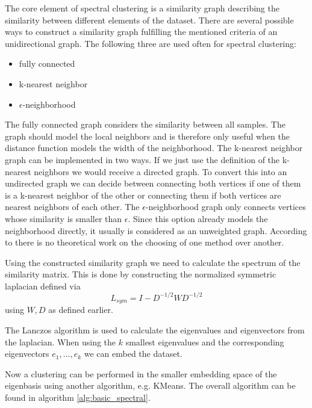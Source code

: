 The core element of spectral clustering is a similarity graph describing the similarity between different elements of the dataset.
There are several possible ways to construct a similarity graph fulfilling the mentioned criteria of an unidirectional graph.
The following three are used often for spectral clustering:
\begin{itemize}
  \item fully connected
  \item k-nearest neighbor
  \item \(\epsilon\)-neighborhood
\end{itemize}
The fully connected graph considers the similarity between all samples. The graph should model the local neighbors and is therefore only useful when the distance function
models the width of the neighborhood.
The k-nearest neighbor graph can be implemented in two ways. If we just use the definition of the k-nearest neighbors we would receive a directed graph.
To convert this into an undirected graph we can decide between connecting both vertices if one of them is a k-nearest neighbor of the other or connecting them if both vertices are nearest neighbors of each other.
The \(\epsilon\)-neighborhood graph only connects vertices whose similarity is smaller than \(\epsilon\).
Since this option already models the neighborhood directly, it usually is considered as an unweighted graph. \cite{von_luxburg_tutorial_2007}
According to \cite{von_luxburg_tutorial_2007} there is no theoretical work on the choosing of one method over
another.

Using the constructed similarity graph we need to calculate the spectrum of the similarity matrix.
This is done by constructing the normalized symmetric laplacian defined via
\[L_{sym} = I - D^{-1/2} W D^{-1/2}\]
using \(W, D\) as defined earlier.

The Lanczos algorithm \cite{lanczos_iteration_1950} is used to calculate the eigenvalues and eigenvectors from the laplacian.
When using the \(k\) smallest eigenvalues and the corresponding eigenvectors \(e_1, \ldots, e_k\) we can embed the dataset.

Now a clustering can be performed in the smaller embedding space of the eigenbasis using another algorithm, e.g. KMeans.
The overall algorithm can be found in algorithm \ref{alg:basic_spectral}.

